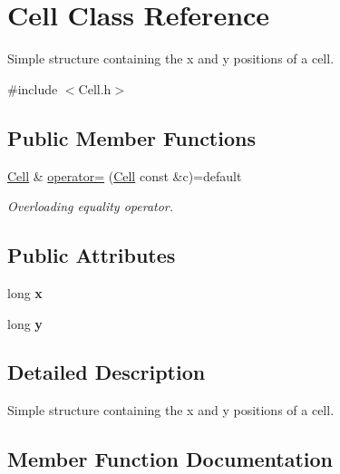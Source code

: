 \hypertarget{struct_cell}{}\section{Cell Class Reference}
\label{struct_cell}


Simple structure containing the x and y positions of a cell.  




{\ttfamily \#include $<$Cell.\+h$>$}

\subsection*{Public Member Functions}
\begin{DoxyCompactItemize}
\item 
\hyperlink{struct_cell}{Cell} \& \hyperlink{struct_cell_ac1f905d4cd626cc32963ab7a6f76634e}{operator=} (\hyperlink{struct_cell}{Cell} const \&c)=default
\begin{DoxyCompactList}\small\item\em Overloading equality operator. \end{DoxyCompactList}\end{DoxyCompactItemize}
\subsection*{Public Attributes}
\begin{DoxyCompactItemize}
\item 
long {\bfseries x}\hypertarget{struct_cell_a20ccaf4c7a18ce06930f961ed4fe3851}{}\label{struct_cell_a20ccaf4c7a18ce06930f961ed4fe3851}

\item 
long {\bfseries y}\hypertarget{struct_cell_a05aaf17f035c254584190b8ada505efc}{}\label{struct_cell_a05aaf17f035c254584190b8ada505efc}

\end{DoxyCompactItemize}


\subsection{Detailed Description}
Simple structure containing the x and y positions of a cell. 

\subsection{Member Function Documentation}
